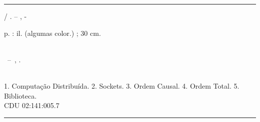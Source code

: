 \documentclass[
	12pt,				%
	openright,			%
	oneside,			%
	a4paper,			%
	english,			%
	french,				%
	spanish,			%
	brazil				%
	]{abntex2}
\begin{document}
\frenchspacing


\imprimircapa

\imprimirfolhaderosto*


%
%     
\begin{fichacatalografica}
	\vspace*{\fill}					%
	\hrule							%
	\begin{center}					%
		\begin{minipage}[c]{12.5cm}		%

			\imprimirautor

			\hspace{0.5cm} \imprimirtitulo  / \imprimirautor. --
			\imprimirlocal, \imprimirdata-

			\hspace{0.5cm} \pageref{LastPage} p. : il. (algumas color.) ; 30 cm.\\

			\hspace{0.5cm} \imprimirorientadorRotulo~\imprimirorientador\\

			\hspace{0.5cm}
			\parbox[t]{\textwidth}{\imprimirtipotrabalho~--~\imprimirinstituicao,
				\imprimirdata.}\\

			\hspace{0.5cm}
			1. Computação Distribuída.
			2. Sockets.
			3. Ordem Causal.
			4. Ordem Total.
			5. Biblioteca.\\

			\hspace{8.75cm} CDU 02:141:005.7\\

		\end{minipage}
	\end{center}
	\hrule
\end{fichacatalografica}
%
\end{document}
